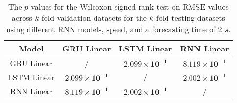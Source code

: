 \begin{table}[!ht]
	\centering
	\begin{tabular}{|c|c|c|c|}
		\hline
		Model & GRU Linear & LSTM Linear & RNN Linear \\ \hline
		GRU Linear & / & $\mathbf{2.099 \times 10^{-1}}$ & $\mathbf{8.119 \times 10^{-1}}$ \\ \hline
		LSTM Linear & $\mathbf{2.099 \times 10^{-1}}$ & / & $\mathbf{2.002 \times 10^{-1}}$ \\ \hline
		RNN Linear & $\mathbf{8.119 \times 10^{-1}}$ & $\mathbf{2.002 \times 10^{-1}}$ & / \\ \hline
	\end{tabular}
	\caption{The $p$-values for the Wilcoxon signed-rank test on RMSE values across $k$-fold validation datasets for the $k$-fold testing datasets using different RNN models, speed, and a forecasting time of $2$ $s$.}
	\label{tab:RMSE:speed:p:2}
\end{table}

